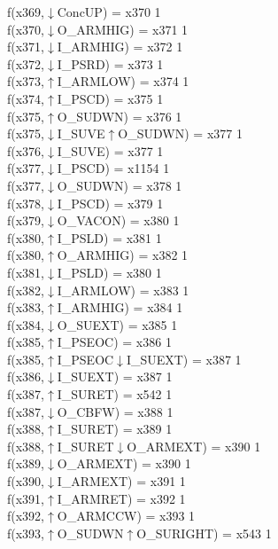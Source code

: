 f(x369,$\downarrow$ConcUP) = x370 {1} \\
f(x370,$\downarrow$O\_ARMHIG) = x371 {1} \\
f(x371,$\downarrow$I\_ARMHIG) = x372 {1} \\
f(x372,$\downarrow$I\_PSRD) = x373 {1} \\
f(x373,$\uparrow$I\_ARMLOW) = x374 {1} \\
f(x374,$\uparrow$I\_PSCD) = x375 {1} \\
f(x375,$\uparrow$O\_SUDWN) = x376 {1} \\
f(x375,$\downarrow$I\_SUVE$\uparrow$O\_SUDWN) = x377 {1} \\
f(x376,$\downarrow$I\_SUVE) = x377 {1} \\
f(x377,$\downarrow$I\_PSCD) = x1154 {1} \\
f(x377,$\downarrow$O\_SUDWN) = x378 {1} \\
f(x378,$\downarrow$I\_PSCD) = x379 {1} \\
f(x379,$\downarrow$O\_VACON) = x380 {1} \\
f(x380,$\uparrow$I\_PSLD) = x381 {1} \\
f(x380,$\uparrow$O\_ARMHIG) = x382 {1} \\
f(x381,$\downarrow$I\_PSLD) = x380 {1} \\
f(x382,$\downarrow$I\_ARMLOW) = x383 {1} \\
f(x383,$\uparrow$I\_ARMHIG) = x384 {1} \\
f(x384,$\downarrow$O\_SUEXT) = x385 {1} \\
f(x385,$\uparrow$I\_PSEOC) = x386 {1} \\
f(x385,$\uparrow$I\_PSEOC$\downarrow$I\_SUEXT) = x387 {1} \\
f(x386,$\downarrow$I\_SUEXT) = x387 {1} \\
f(x387,$\uparrow$I\_SURET) = x542 {1} \\
f(x387,$\downarrow$O\_CBFW) = x388 {1} \\
f(x388,$\uparrow$I\_SURET) = x389 {1} \\
f(x388,$\uparrow$I\_SURET$\downarrow$O\_ARMEXT) = x390 {1} \\
f(x389,$\downarrow$O\_ARMEXT) = x390 {1} \\
f(x390,$\downarrow$I\_ARMEXT) = x391 {1} \\
f(x391,$\uparrow$I\_ARMRET) = x392 {1} \\
f(x392,$\uparrow$O\_ARMCCW) = x393 {1} \\
f(x393,$\uparrow$O\_SUDWN$\uparrow$O\_SURIGHT) = x543 {1} \\
